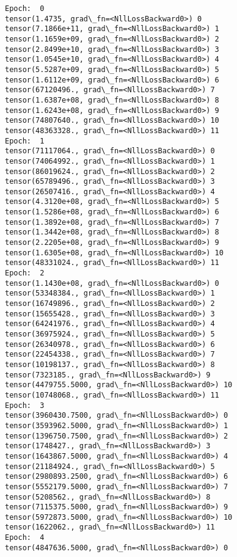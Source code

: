 \documentclass[11pt]{article}
\begin{document}
    \begin{Verbatim}[commandchars=\\\{\}]
Epoch:  0
tensor(1.4735, grad\_fn=<NllLossBackward0>) 0
tensor(7.1866e+11, grad\_fn=<NllLossBackward0>) 1
tensor(1.1659e+09, grad\_fn=<NllLossBackward0>) 2
tensor(2.8499e+10, grad\_fn=<NllLossBackward0>) 3
tensor(1.0545e+10, grad\_fn=<NllLossBackward0>) 4
tensor(5.5287e+09, grad\_fn=<NllLossBackward0>) 5
tensor(1.6112e+09, grad\_fn=<NllLossBackward0>) 6
tensor(67120496., grad\_fn=<NllLossBackward0>) 7
tensor(1.6387e+08, grad\_fn=<NllLossBackward0>) 8
tensor(1.6243e+08, grad\_fn=<NllLossBackward0>) 9
tensor(74807640., grad\_fn=<NllLossBackward0>) 10
tensor(48363328., grad\_fn=<NllLossBackward0>) 11
Epoch:  1
tensor(71117064., grad\_fn=<NllLossBackward0>) 0
tensor(74064992., grad\_fn=<NllLossBackward0>) 1
tensor(86019624., grad\_fn=<NllLossBackward0>) 2
tensor(65789496., grad\_fn=<NllLossBackward0>) 3
tensor(26507416., grad\_fn=<NllLossBackward0>) 4
tensor(4.3120e+08, grad\_fn=<NllLossBackward0>) 5
tensor(1.5286e+08, grad\_fn=<NllLossBackward0>) 6
tensor(1.3892e+08, grad\_fn=<NllLossBackward0>) 7
tensor(1.3442e+08, grad\_fn=<NllLossBackward0>) 8
tensor(2.2205e+08, grad\_fn=<NllLossBackward0>) 9
tensor(1.6305e+08, grad\_fn=<NllLossBackward0>) 10
tensor(48331024., grad\_fn=<NllLossBackward0>) 11
Epoch:  2
tensor(1.1430e+08, grad\_fn=<NllLossBackward0>) 0
tensor(53348384., grad\_fn=<NllLossBackward0>) 1
tensor(16749896., grad\_fn=<NllLossBackward0>) 2
tensor(15655428., grad\_fn=<NllLossBackward0>) 3
tensor(64241976., grad\_fn=<NllLossBackward0>) 4
tensor(36975924., grad\_fn=<NllLossBackward0>) 5
tensor(26340978., grad\_fn=<NllLossBackward0>) 6
tensor(22454338., grad\_fn=<NllLossBackward0>) 7
tensor(10198137., grad\_fn=<NllLossBackward0>) 8
tensor(7323185., grad\_fn=<NllLossBackward0>) 9
tensor(4479755.5000, grad\_fn=<NllLossBackward0>) 10
tensor(10748068., grad\_fn=<NllLossBackward0>) 11
Epoch:  3
tensor(3960430.7500, grad\_fn=<NllLossBackward0>) 0
tensor(3593962.5000, grad\_fn=<NllLossBackward0>) 1
tensor(1396750.7500, grad\_fn=<NllLossBackward0>) 2
tensor(1748427., grad\_fn=<NllLossBackward0>) 3
tensor(1643867.5000, grad\_fn=<NllLossBackward0>) 4
tensor(21184924., grad\_fn=<NllLossBackward0>) 5
tensor(2980893.2500, grad\_fn=<NllLossBackward0>) 6
tensor(5552179.5000, grad\_fn=<NllLossBackward0>) 7
tensor(5208562., grad\_fn=<NllLossBackward0>) 8
tensor(7115375.5000, grad\_fn=<NllLossBackward0>) 9
tensor(5972873.5000, grad\_fn=<NllLossBackward0>) 10
tensor(1622062., grad\_fn=<NllLossBackward0>) 11
Epoch:  4
tensor(4847636.5000, grad\_fn=<NllLossBackward0>) 0

\end{Verbatim}
\end{document}
